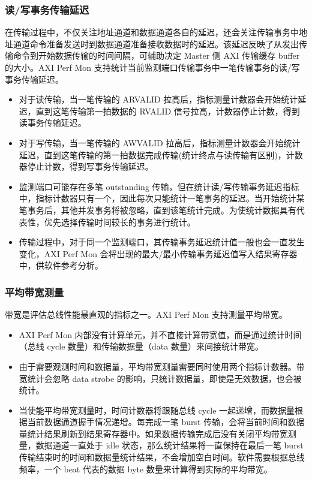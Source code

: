 \documentclass[main\_\_CN.tex]{subfiles}
\begin{document}
\subsubsection{读/写事务传输延迟}
在传输过程中，不仅关注地址通道和数据通道各自的延迟，还会关注传输事务中地址通道命令准备发送时到数据通道准备接收数据时的延迟。该延迟反映了从发出传输命令到开始数据传输的时间间隔，可辅助决定 Master 侧 AXI 传输缓存 buffer 的大小。AXI Perf Mon 支持统计当前监测端口传输事务中一笔传输事务的读/写事务传输延迟。
\begin{itemize}
    \item 对于读传输，当一笔传输的 ARVALID 拉高后，指标测量计数器会开始统计延迟，直到这笔传输第一拍数据的 RVALID 信号拉高，计数器停止计数，得到读事务传输延迟。
    \item 对于写传输，当一笔传输的 AWVALID 拉高后，指标测量计数器会开始统计延迟，直到这笔传输的第一拍数据完成传输(统计终点与读传输有区别)，计数器停止计数，得到写事务传输延迟。
    \item 监测端口可能存在多笔 outstanding 传输，但在统计读/写传输事务延迟指标中，指标计数器只有一个，因此每次只能统计一笔事务的延迟。当开始统计某笔事务后，其他并发事务将被忽略，直到该笔统计完成。为使统计数据具有代表性，优先选择传输时间较长的事务进行统计。
    \item 传输过程中，对于同一个监测端口，其传输事务延迟统计值一般也会一直发生变化，AXI Perf Mon 会将出现的最大/最小传输事务延迟值写入结果寄存器中，供软件参考分析。
\end{itemize}

\subsubsection{平均带宽测量}
带宽是评估总线性能最直观的指标之一。AXI Perf Mon 支持测量平均带宽。
\begin{itemize}
    \item AXI Perf Mon 内部没有计算单元，并不直接计算带宽值，而是通过统计时间（总线 cycle 数量）和传输数据量（data 数量）来间接统计带宽。
    \item 由于需要观测时间和数据量，平均带宽测量需要同时使用两个指标计数器。带宽统计会忽略 data strobe 的影响，只统计数据量，即使是无效数据，也会被统计。
    \item 当使能平均带宽测量时，时间计数器将跟随总线 cycle 一起递增，而数据量根据当前数据通道握手情况递增。每完成一笔 burst 传输，会将当前时间和数据量统计结果刷新到结果寄存器中。如果数据传输完成后没有关闭平均带宽测量，数据通道一直处于 idle 状态，那么统计结果将一直保持在最后一笔 burst 传输结束时的时间和数据量统计结果，不会增加空白时间。软件需要根据总线频率，一个 beat 代表的数据 byte 数量来计算得到实际的平均带宽。
\end{itemize}
\end{document}
